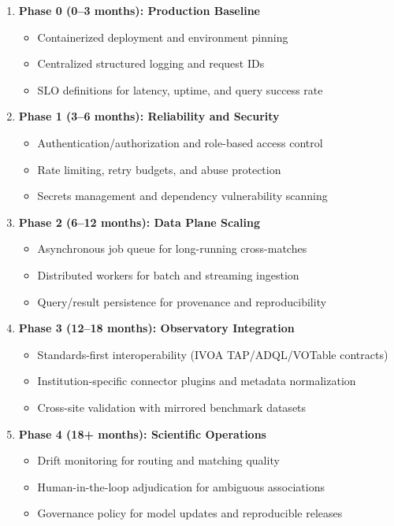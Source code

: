\documentclass[10pt]{article}
\begin{document}
\begin{enumerate}
    \item \textbf{Phase 0 (0--3 months): Production Baseline}
    \begin{itemize}
        \item Containerized deployment and environment pinning
        \item Centralized structured logging and request IDs
        \item SLO definitions for latency, uptime, and query success rate
    \end{itemize}

    \item \textbf{Phase 1 (3--6 months): Reliability and Security}
    \begin{itemize}
        \item Authentication/authorization and role-based access control
        \item Rate limiting, retry budgets, and abuse protection
        \item Secrets management and dependency vulnerability scanning
    \end{itemize}

    \item \textbf{Phase 2 (6--12 months): Data Plane Scaling}
    \begin{itemize}
        \item Asynchronous job queue for long-running cross-matches
        \item Distributed workers for batch and streaming ingestion
        \item Query/result persistence for provenance and reproducibility
    \end{itemize}

    \item \textbf{Phase 3 (12--18 months): Observatory Integration}
    \begin{itemize}
        \item Standards-first interoperability (IVOA TAP/ADQL/VOTable contracts)
        \item Institution-specific connector plugins and metadata normalization
        \item Cross-site validation with mirrored benchmark datasets
    \end{itemize}

    \item \textbf{Phase 4 (18+ months): Scientific Operations}
    \begin{itemize}
        \item Drift monitoring for routing and matching quality
        \item Human-in-the-loop adjudication for ambiguous associations
        \item Governance policy for model updates and reproducible releases
    \end{itemize}
\end{enumerate}
\end{document}
